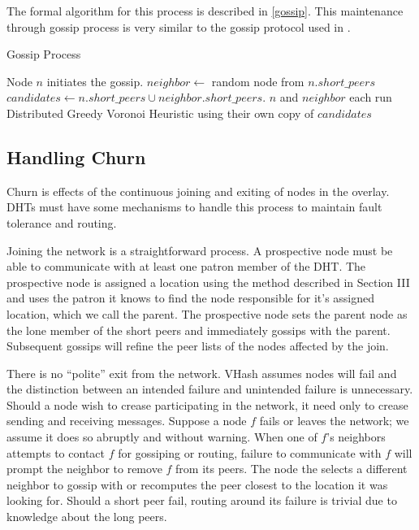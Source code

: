 \documentclass{IEEEtran}
\begin{document}
The formal algorithm for this process is described in \ref{gossip}.
This maintenance through gossip process is very similar to the gossip protocol used in \cite{raynet}.


\begin{algorithm}
\caption{Gossip Process}
\label{gossip}
\begin{algorithmic}[1]  %
	\STATE Node $n$ initiates the gossip.
	\STATE $neighbor \leftarrow$ random node from $n.short\_peers$
    \STATE $candidates \leftarrow n.short\_peers \cup neighbor.short\_peers$.
    \STATE $n$ and $neighbor$ each run Distributed Greedy Voronoi Heuristic using their own copy of $candidates$
\end{algorithmic} 
\end{algorithm}



\subsection{Handling Churn}
Churn is effects of the continuous joining and exiting of nodes in the overlay.
DHTs must have some mechanisms to handle this process to maintain fault tolerance and routing.

Joining the network is a straightforward process.  
A prospective node must be able to communicate with at least one patron member of the DHT.  
The prospective node is assigned a location using the method described in Section III and uses the patron it knows to find the node responsible for it's assigned location, which we call the parent.
The prospective node sets the parent node as the lone member of the short peers and immediately gossips with the parent.
Subsequent gossips will refine the peer lists of the nodes affected by the join.

There is no ``polite'' exit from the network. VHash assumes nodes will fail and the distinction between an intended failure and unintended failure is unnecessary.
Should a node wish to crease participating in the network, it need only to crease sending and receiving messages.
Suppose a node $f$ fails or leaves the network; we assume it does so abruptly and without warning.
When one of $f$'s neighbors attempts to contact $f$ for gossiping or routing, failure to communicate with $f$ will prompt the neighbor to remove $f$ from its peers.  
The node the selects a different neighbor to gossip with or recomputes the peer closest to the location it was looking for. 
Should a short peer fail, routing around its failure is trivial due to knowledge about the long peers.
\end{document}
